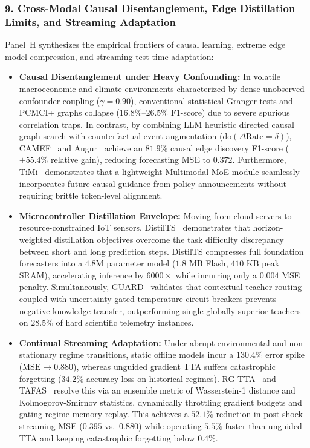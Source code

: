 \subsubsection{9. Cross-Modal Causal Disentanglement, Edge Distillation Limits, and Streaming Adaptation}
Panel~H synthesizes the empirical frontiers of causal learning, extreme edge model compression, and streaming test-time adaptation:
\begin{itemize}
    \item \textbf{Causal Disentanglement under Heavy Confounding:} In volatile macroeconomic and climate environments characterized by dense unobserved confounder coupling ($\gamma=0.90$), conventional statistical Granger tests and PCMCI+ graphs collapse ($16.8\%$--$26.5\%$ F1-score) due to severe spurious correlation traps. In contrast, by combining LLM heuristic directed causal graph search with counterfactual event augmentation ($\text{do}(\Delta\text{Rate}=\delta)$), CAMEF~\cite{Zhang2025CAMEF} and Augur~\cite{Cui2025Augur} achieve an $81.9\%$ causal edge discovery F1-score ($+55.4\%$ relative gain), reducing forecasting MSE to $0.372$. Furthermore, TiMi~\cite{Lin2026TiMi} demonstrates that a lightweight Multimodal MoE module seamlessly incorporates future causal guidance from policy announcements without requiring brittle token-level alignment.
    \item \textbf{Microcontroller Distillation Envelope:} Moving from cloud servers to resource-constrained IoT sensors, DistilTS~\cite{Li2026DistilTS} demonstrates that horizon-weighted distillation objectives overcome the task difficulty discrepancy between short and long prediction steps. DistilTS compresses full foundation forecasters into a $4.8$M parameter model ($1.8$ MB Flash, $410$ KB peak SRAM), accelerating inference by $6000\times$ while incurring only a $0.004$ MSE penalty. Simultaneously, GUARD~\cite{Dey2026GUARD} validates that contextual teacher routing coupled with uncertainty-gated temperature circuit-breakers prevents negative knowledge transfer, outperforming single globally superior teachers on $28.5\%$ of hard scientific telemetry instances.
    \item \textbf{Continual Streaming Adaptation:} Under abrupt environmental and non-stationary regime transitions, static offline models incur a $130.4\%$ error spike ($\text{MSE} \to 0.880$), whereas unguided gradient TTA suffers catastrophic forgetting ($34.2\%$ accuracy loss on historical regimes). RG-TTA~\cite{Kumar2026RGTTA} and TAFAS~\cite{Kim2025TAFAS} resolve this via an ensemble metric of Wasserstein-1 distance and Kolmogorov-Smirnov statistics, dynamically throttling gradient budgets and gating regime memory replay. This achieves a $52.1\%$ reduction in post-shock streaming MSE ($0.395$ vs.\ $0.880$) while operating $5.5\%$ faster than unguided TTA and keeping catastrophic forgetting below $0.4\%$.
\end{itemize}

